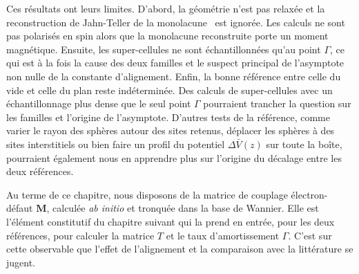 Ces résultats ont leurs limites. D'abord, la géométrie n'est pas relaxée et la reconstruction de Jahn-Teller de la monolacune~\cite{el-barbaryStructureEnergeticsVacancy2003} est ignorée. Les calculs ne sont pas polarisés en spin alors que la monolacune reconstruite porte un moment magnétique. Ensuite, les super-cellules ne sont échantillonnées qu'au point $\Gamma$, ce qui est à la fois la cause des deux familles et le suspect principal de l'asymptote non nulle de la constante d'alignement. Enfin, la bonne référence entre celle du vide et celle du plan reste indéterminée. Des calculs de super-cellules avec un échantillonnage plus dense que le seul point $\Gamma$ pourraient trancher la question sur les familles et l'origine de l'asymptote. D'autres tests de la référence, comme varier le rayon des sphères autour des sites retenus, déplacer les sphères à des sites interstitiels ou bien faire un profil du potentiel $\Delta\bar V(z)$ sur toute la boîte, pourraient également nous en apprendre plus sur l'origine du décalage entre les deux références.

Au terme de ce chapitre, nous disposons de la matrice de couplage électron-défaut $\bm M$, calculée \textit{ab initio} et tronquée dans la base de Wannier. Elle est l'élément constitutif du chapitre suivant qui la prend en entrée, pour les deux références, pour calculer la matrice $T$ et le taux d'amortissement $\Gamma$. C'est sur cette observable que l'effet de l'alignement et la comparaison avec la littérature se jugent.